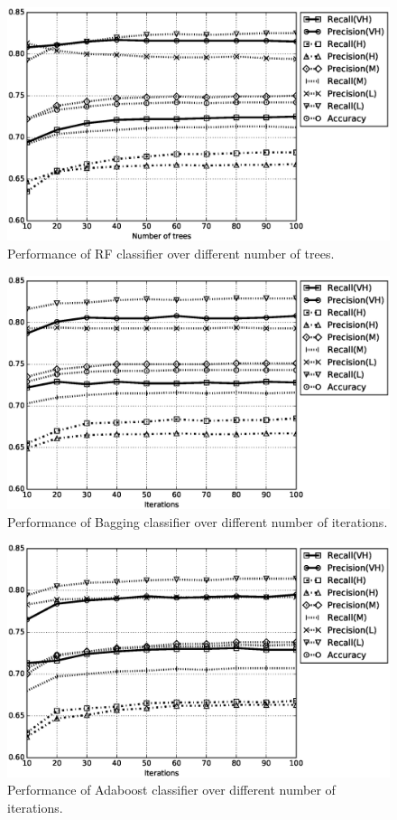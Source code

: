 \documentclass[a4paper,10pt,onecolumn,preprint,3p]{elsarticle}
\begin{document}
\begin{figure}

\centerline{\includegraphics[scale=0.46]{RF}}

\caption{Performance of RF classifier over different number of trees.}
\label{fig:PerformanceRF}
\end{figure}

\begin{figure}
\centerline{
\includegraphics[scale=0.46]{Bagging}}

\caption{Performance of Bagging classifier over different number of iterations.}
\label{fig:PerformanceBagging}
\end{figure}

\begin{figure}
\centerline{
\includegraphics[scale=0.46]{Adaboost}
}
\caption{Performance of Adaboost classifier over different number of iterations.}
\label{fig:PerformanceAdaboost}
\end{figure}
\end{document}
